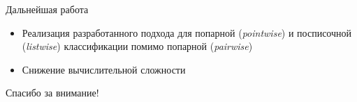 \documentclass[11pt]{beamer}
\begin{document}
\begin{frame}{Дальнейшая работа}

\begin{itemize}
	\item Реализация разработанного подхода для попарной (\textit{pointwise}) и посписочной (\textit{listwise}) классификации помимо попарной (\textit{pairwise})
	\item Снижение вычислительной сложности
\end{itemize}

\end{frame}
\begin{frame}

\begin{center}
{\Large Спасибо за внимание!}
\end{center}

\end{frame}
\end{document}
